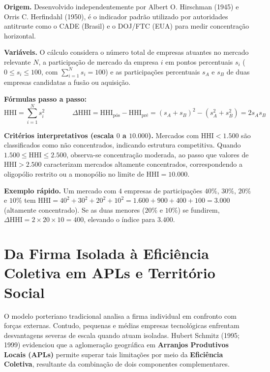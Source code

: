 \begin{boxFormula}
\textbf{Origem.} Desenvolvido independentemente por Albert O. Hirschman (1945) e Orris C. Herfindahl (1950), é o indicador padrão utilizado por autoridades antitruste como o CADE (Brasil) e o DOJ/FTC (EUA) para medir concentração horizontal.

\textbf{Variáveis.} O cálculo considera o número total de empresas atuantes no mercado relevante $N$, a participação de mercado da empresa $i$ em pontos percentuais $s_i$ ($0 \le s_i \le 100$, com $\sum_{i=1}^N s_i = 100$) e as participações percentuais $s_A$ e $s_B$ de duas empresas candidatas a fusão ou aquisição.

\textbf{Fórmulas passo a passo:}
\[
\text{HHI} = \sum_{i=1}^{N} s_i^2
\qquad\qquad
\Delta \text{HHI} = \text{HHI}_{\text{pós}} - \text{HHI}_{\text{pré}} = (s_A + s_B)^2 - (s_A^2 + s_B^2) = 2 s_A s_B
\]

\textbf{Critérios interpretativos (escala $0$ a $10.000$).} Mercados com $\text{HHI} < 1.500$ são classificados como não concentrados, indicando estrutura competitiva. Quando $1.500 \le \text{HHI} \le 2.500$, observa-se concentração moderada, ao passo que valores de $\text{HHI} > 2.500$ caracterizam mercados altamente concentrados, correspondendo a oligopólio restrito ou a monopólio no limite de $\text{HHI} = 10.000$.

\textbf{Exemplo rápido.} Um mercado com $4$ empresas de participações $40\%$, $30\%$, $20\%$ e $10\%$ tem $\text{HHI} = 40^2 + 30^2 + 20^2 + 10^2 = 1.600 + 900 + 400 + 100 = 3.000$ (altamente concentrado). Se as duas menores ($20\%$ e $10\%$) se fundirem, $\Delta \text{HHI} = 2 \times 20 \times 10 = 400$, elevando o índice para $3.400$.
\end{boxFormula}

\section{Da Firma Isolada à Eficiência Coletiva em APLs e Território Social}

O modelo porteriano tradicional analisa a firma individual em confronto com forças externas. Contudo, pequenas e médias empresas tecnológicas enfrentam desvantagens severas de escala quando atuam isoladas. Hubert Schmitz (1995; 1999) evidenciou que a aglomeração geográfica em \textbf{Arranjos Produtivos Locais (APLs)} permite superar tais limitações por meio da \textbf{Eficiência Coletiva}, resultante da combinação de dois componentes complementares.

